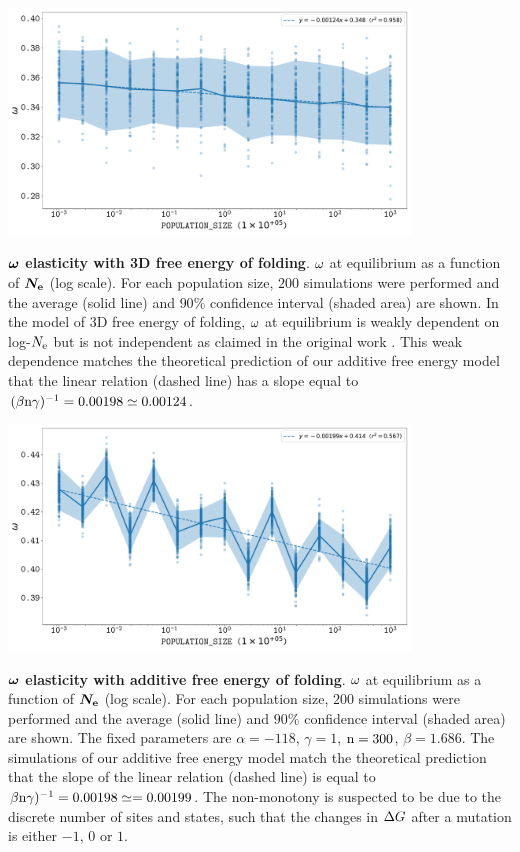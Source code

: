 \documentclass{article}
\begin{document}
\begin{center}
	\includegraphics[width=0.8\textwidth] {artworks/SimuFold-Elasticity.pdf}
\end{center}
\textbf{$\bm{\omega}$ elasticity with 3D free energy of folding}.
$\omega$ at equilibrium as a function of $\bm{N_{\mathrm{e}}}$ (log scale).
For each population size, $200$ simulations were performed and the average (solid line) and $90\%$ confidence interval (shaded area) are shown.
In the model of 3D free energy of folding, $\omega$ at equilibrium is weakly dependent on log-$N_{\mathrm{e}}$ but is not independent as claimed in the original work \cite{Goldstein2013}.
This weak dependence matches the theoretical prediction of our additive free energy model that the linear relation (dashed line) has a slope equal to $(\beta  \text{n} \gamma)^{-1} = 0.00198 \simeq 0.00124$.

\begin{center}
	\includegraphics[width=0.8\textwidth] {artworks/SimuStab-Elasticity.pdf}
\end{center}
\textbf{$\bm{\omega}$ elasticity with additive free energy of folding}.
$\omega$ at equilibrium as a function of $\bm{N_{\mathrm{e}}}$ (log scale).
For each population size, $200$ simulations were performed and the average (solid line) and $90\%$ confidence interval (shaded area) are shown.
The fixed parameters are $\alpha=-118$, $\gamma=1$, $\text{n}=300$, $\beta=1.686$.
The simulations of our additive free energy model match the theoretical prediction that the slope of the linear relation (dashed line) is equal to $\beta \text{n} \gamma)^{-1} = 0.00198 \simeq = 0.00199$.
The non-monotony is suspected to be due to the discrete number of sites and states, such that the changes in $\Delta G$ after a mutation is either $-1$, $0$ or $1$.
\end{document}
